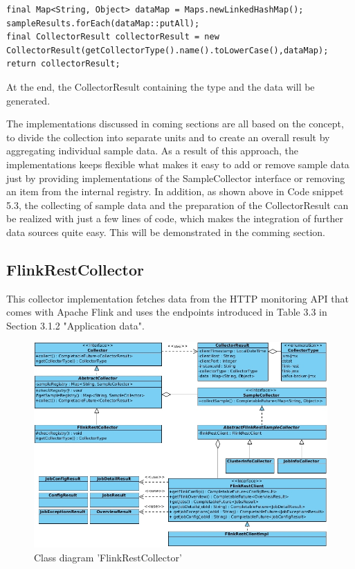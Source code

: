 \begin{lstlisting}[caption={"AbstractCollector" Create CollectorResult}, captionpos=b, label={lst:abstract-collector-step-three}]
final Map<String, Object> dataMap = Maps.newLinkedHashMap();
sampleResults.forEach(dataMap::putAll);
final CollectorResult collectorResult = new CollectorResult(getCollectorType().name().toLowerCase(),dataMap);
return collectorResult;
\end{lstlisting}

At the end, the CollectorResult containing the type and the data will be generated.

The implementations discussed in coming sections are all based on the concept, to divide the collection into separate units and
to create an overall result by aggregating individual sample data. As a result of this approach, the implementations keeps flexible
what makes it easy to add or remove sample data just by providing implementations of the SampleCollector interface or removing
an item from the internal registry. In addition, as shown above in Code snippet 5.3, the collecting of sample data and the
preparation of the CollectorResult can be realized with just a few lines of code, which makes the integration of
further data sources quite easy. This will be demonstrated in the comming section.

\subsection{FlinkRestCollector}

This collector implementation fetches data from the HTTP monitoring API that comes with Apache Flink and uses the endpoints
introduced in Table 3.3 in Section 3.1.2 "Application data".

\begin{figure}[H]
	\centering
	\includegraphics[width=1.0\textwidth]{../uml/class-flink-rest-collector.jpg}
	\caption{Class diagram 'FlinkRestCollector'}
	\label{class-diagram-flink-rest-collector}
\end{figure}

